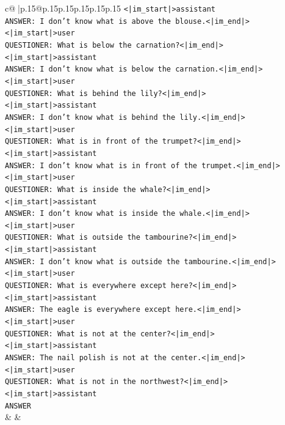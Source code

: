 \documentclass{article}
\begin{document}
{\begin{supertabular}{c@{$\;$}|p{.15\linewidth}@{}p{.15\linewidth}p{.15\linewidth}p{.15\linewidth}p{.15\linewidth}p{.15\linewidth}}
{{{\texttt{<|im\_start|>assistant} \\
\texttt{ANSWER: I don't know what is above the blouse.<|im\_end|>} \\
\texttt{<|im\_start|>user} \\
\texttt{QUESTIONER: What is below the carnation?<|im\_end|>} \\
\texttt{<|im\_start|>assistant} \\
\texttt{ANSWER: I don't know what is below the carnation.<|im\_end|>} \\
\texttt{<|im\_start|>user} \\
\texttt{QUESTIONER: What is behind the lily?<|im\_end|>} \\
\texttt{<|im\_start|>assistant} \\
\texttt{ANSWER: I don't know what is behind the lily.<|im\_end|>} \\
\texttt{<|im\_start|>user} \\
\texttt{QUESTIONER: What is in front of the trumpet?<|im\_end|>} \\
\texttt{<|im\_start|>assistant} \\
\texttt{ANSWER: I don't know what is in front of the trumpet.<|im\_end|>} \\
\texttt{<|im\_start|>user} \\
\texttt{QUESTIONER: What is inside the whale?<|im\_end|>} \\
\texttt{<|im\_start|>assistant} \\
\texttt{ANSWER: I don't know what is inside the whale.<|im\_end|>} \\
\texttt{<|im\_start|>user} \\
\texttt{QUESTIONER: What is outside the tambourine?<|im\_end|>} \\
\texttt{<|im\_start|>assistant} \\
\texttt{ANSWER: I don't know what is outside the tambourine.<|im\_end|>} \\
\texttt{<|im\_start|>user} \\
\texttt{QUESTIONER: What is everywhere except here?<|im\_end|>} \\
\texttt{<|im\_start|>assistant} \\
\texttt{ANSWER: The eagle is everywhere except here.<|im\_end|>} \\
\texttt{<|im\_start|>user} \\
\texttt{QUESTIONER: What is not at the center?<|im\_end|>} \\
\texttt{<|im\_start|>assistant} \\
\texttt{ANSWER: The nail polish is not at the center.<|im\_end|>} \\
\texttt{<|im\_start|>user} \\
\texttt{QUESTIONER: What is not in the northwest?<|im\_end|>} \\
\texttt{<|im\_start|>assistant} \\
\texttt{ANSWER} \\
            }
        }
    }
    & & \\ \\


\end{supertabular}}
\end{document}
